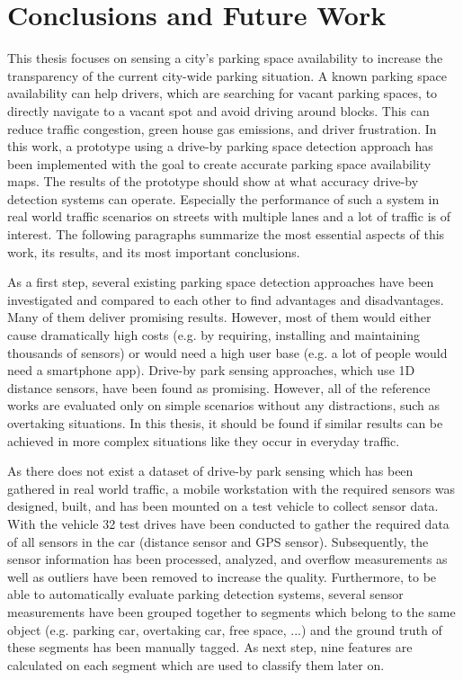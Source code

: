 \chapter{Conclusions and Future Work}
\label{chap:conclusion}



This thesis focuses on sensing a city's parking space availability to increase the transparency of the current city-wide parking situation. 
A known parking space availability can help drivers, which are searching for vacant parking spaces, to directly navigate to a vacant spot and avoid driving around blocks. This can reduce traffic congestion, green house gas emissions, and driver frustration. 
In this work, a prototype using a drive-by parking space detection approach has been implemented with the goal to create accurate parking space availability maps. The results of the prototype should show at what accuracy drive-by detection systems can operate. Especially the performance of such a system in real world traffic scenarios on streets with multiple lanes and a lot of traffic is of interest.
The following paragraphs summarize the most essential aspects of this work, its results, and its most important conclusions.



As a first step, several existing parking space detection approaches have been investigated and compared to each other to find advantages and disadvantages.
Many of them deliver promising results. However, most of them would either cause dramatically high costs (e.g. by requiring, installing and maintaining thousands of sensors) or would need a high user base (e.g. a lot of people would need a smartphone app). 
 Drive-by park sensing approaches, which use 1D distance sensors, have been found as promising. However, all of the reference works are evaluated only on simple scenarios without any distractions, such as overtaking situations. 
 In this thesis, it should be found if similar results can be achieved in more complex situations like they occur in everyday traffic.


As there does not exist a dataset of drive-by park sensing which has been gathered in real world traffic, a mobile workstation with the required sensors was designed, built, and has been mounted on a test vehicle to collect sensor data. With the vehicle 32 test drives have been conducted to gather the required data of all sensors in the car (distance sensor and GPS sensor). Subsequently, the sensor information has been processed, analyzed, and overflow measurements as well as outliers have been removed to increase the quality. Furthermore, to be able to automatically evaluate parking detection systems, several sensor measurements have been grouped together to segments which belong to the same object (e.g. parking car, overtaking car, free space, ...) and the ground truth of these segments has been manually tagged. As next step, nine features are calculated on each segment which are used to classify them later on.








